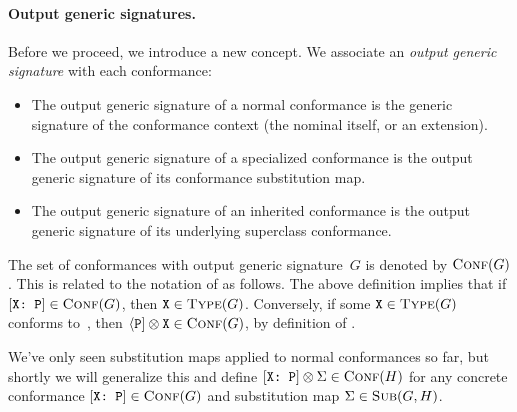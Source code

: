 \documentclass[../generics]{subfiles}
\begin{document}
\paragraph{Output generic signatures.} Before we proceed, we introduce a new concept. We associate an \emph{output generic signature} with each conformance:
\begin{itemize}
\item The output generic signature of a normal conformance is the generic signature of the conformance context (the nominal itself, or an extension). 

\item The output generic signature of a specialized conformance is the output generic signature of its conformance substitution map.

\item The output generic signature of an inherited conformance is the output generic signature of its underlying superclass conformance.
\end{itemize}

The set of conformances with output generic signature~$G$ is denoted by $\textsc{Conf}({G})$. This is related to the notation of  as follows. The above definition implies that if $[\texttt{X:~P}]\in\textsc{Conf}({G})$, then $\texttt{X}\in\textsc{Type}({G})$. Conversely, if some $\texttt{X}\in\textsc{Type}({G})$ conforms to~\tP, then $\langle\texttt{P}] \otimes \texttt{X} \in \textsc{Conf}({G})$, by definition of .

We've only seen substitution maps applied to normal conformances so far, but shortly we will generalize this and define $[\texttt{X:~P}]\otimes\Sigma \in \textsc{Conf}({H})$ for any concrete conformance $[\texttt{X:~P}]\in\textsc{Conf}({G})$ and substitution map $\Sigma\in\textsc{Sub}({G, H})$.
\end{document}
